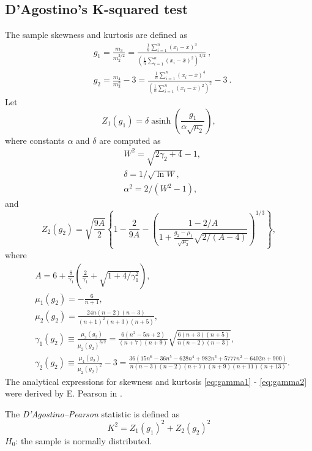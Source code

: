     \subsection{D'Agostino's K-squared test}
        The sample skewness and kurtosis are defined as
        \begin{align}
            & g_1 = \frac{ m_3 }{ m_2^{3/2} } = \frac{\frac{1}{n} \sum_{i=1}^n \left( x_i - \overline{x} \right)^3}{\left( \frac{1}{n} \sum_{i=1}^n \left( x_i - \overline{x} \right)^2 \right)^{3/2}}\ , \\
            & g_2 = \frac{ m_4 }{ m_2^{2} }-3 = \frac{\frac{1}{n} \sum_{i=1}^n \left( x_i - \overline{x} \right)^4}{\left( \frac{1}{n} \sum_{i=1}^n \left( x_i - \overline{x} \right)^2 \right)^2} - 3\ .
        \end{align}
        Let
        \begin{equation}
            Z_1(g_1) = \delta \operatorname{asinh}\left( \frac{g_1}{\alpha\sqrt{\mu_2}} \right),
        \end{equation}
        where constants $\alpha$ and $\delta$ are computed as
        \begin{align}
            & W^2 = \sqrt{2\gamma_2 + 4} - 1, \\
            & \delta = 1 / \sqrt{\ln W}, \\
            & \alpha^2 = 2 / (W^2-1),
        \end{align}
        and
        \begin{equation}
            Z_2(g_2) = \sqrt{\frac{9A}{2}} \left\{1 - \frac{2}{9A} - \left(\frac{ 1-2/A }{ 1+\frac{g_2-\mu_1}{\sqrt{\mu_2}}\sqrt{2/(A-4)} }\right)^{\!1/3}\right\},  
        \end{equation}
        where
        \begin{align}
            & A = 6 + \frac{8}{\gamma_1} \left( \frac{2}{\gamma_1} + \sqrt{1+4/\gamma_1^2}\right), \\
            & \mu_1(g_2) = - \frac{6}{n+1}, \\
            & \mu_2(g_2) = \frac{ 24n(n-2)(n-3) }{ (n+1)^2(n+3)(n+5) }, \\
            & \gamma_1(g_2) \equiv \frac{\mu_3(g_2)}{\mu_2(g_2)^{3/2}} = \frac{6(n^2-5n+2)}{(n+7)(n+9)} \sqrt{\frac{6(n+3)(n+5)}{n(n-2)(n-3)}},  \label{eq:gamma1}\\
            & \gamma_2(g_2) \equiv \frac{\mu_4(g_2)}{\mu_2(g_2)^{2}}-3 = \frac{ 36(15n^6-36n^5-628n^4+982n^3+5777n^2-6402n+900) }{ n(n-3)(n-2)(n+7)(n+9)(n+11)(n+13) }\label{eq:gamma2}.
        \end{align}
        The analytical expressions for skewness and kurtosis \eqref{eq:gamma1} - \eqref{eq:gamma2} were derived by E. Pearson in \cite{Pearson1931}.
        \begin{definition}
            The \emph{D'Agostino--Pearson} statistic is defined as 
            \begin{equation}
                K^2 = Z_1(g_1)^2 + Z_2(g_2)^2
            \end{equation}
            $H_0$: the sample is normally distributed.
        \end{definition}

